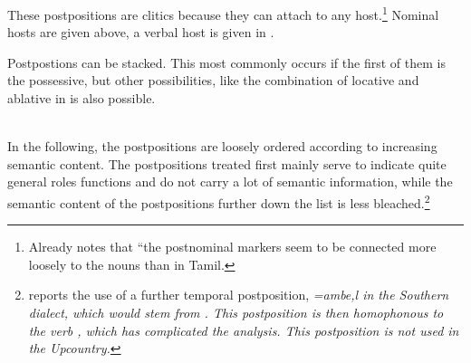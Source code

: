 These postpositions are clitics because they can attach to any host.\footnote{Already \citet{Bakker2006} notes that ``the postnominal markers seem to be connected more loosely to the nouns \el{} than in Tamil.} Nominal hosts are given above, a verbal host is given in  .



% 

Postpostions can be stacked. This most commonly occurs if the first of them is the possessive, but other possibilities, like the combination of locative and ablative in  is also possible.


\\ 

In the following, the postpositions are loosely ordered according to increasing semantic content. The  postpositions treated first mainly serve to indicate quite general roles functions and do not carry a lot of semantic information, while the semantic content of the postpositions further down the list is less bleached.\footnote{
\citep{Slomanson2008ismil} reports the use of a further temporal postposition, \em =ambe,l \em  in the Southern dialect, which would stem from . This postposition is then homophonous to the verb , which has complicated the analysis. This postposition is not used in the Upcountry.}


